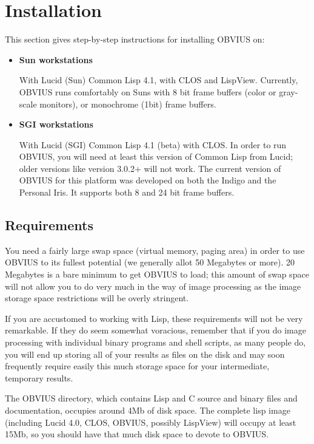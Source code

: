 
\section{Installation}	
\label{sec:install}

This section gives step-by-step instructions for installing OBVIUS on:

\begin{itemize}
\item{{\bf Sun workstations}}

With Lucid (Sun) Common Lisp 4.1, with CLOS and LispView.  Currently,
OBVIUS runs comfortably on Suns with 8 bit frame buffers (color or
gray-scale monitors), or monochrome (1bit) frame buffers.

\item{{\bf SGI workstations}}

With Lucid (SGI) Common Lisp 4.1 (beta) with CLOS.  In order to run
OBVIUS, you will need at least this version of Common Lisp from Lucid;
older versions like version 3.0.2+ will not work.  The current version
of OBVIUS for this platform was developed on both the Indigo and the
Personal Iris.  It supports both 8 and 24 bit frame buffers.

\end{itemize}


\subsection{Requirements}

You need a fairly large swap space (virtual memory, paging area) in
order to use OBVIUS to its fullest potential (we generally allot 50
Megabytes or more).  20 Megabytes is a bare minimum to get OBVIUS to
load; this amount of swap space will not allow you to do very much in
the way of image processing as the image storage space restrictions
will be overly stringent.

If you are accustomed to working with Lisp, these requirements will
not be very remarkable.  If they do seem somewhat voracious, remember
that if you do image processing with individual binary programs and
shell scripts, as many people do, you will end up storing all of your
results as files on the disk and may soon frequently require easily
this much storage space for your intermediate, temporary results.

The OBVIUS directory, which contains Lisp and C source and binary
files and documentation, occupies around 4Mb of disk space.  The
complete lisp image (including Lucid 4.0, CLOS, OBVIUS, possibly
LispView) will occupy at least 15Mb, so you should have that much disk
space to devote to OBVIUS.

